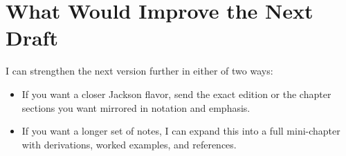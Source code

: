 \documentclass[12pt]{article}
\begin{document}
\section*{What Would Improve the Next Draft}
I can strengthen the next version further in either of two ways:
\begin{itemize}
\item If you want a closer Jackson flavor, send the exact edition or the chapter sections you want mirrored in notation and emphasis.
\item If you want a longer set of notes, I can expand this into a full mini-chapter with derivations, worked examples, and references.
\end{itemize}
\end{document}

